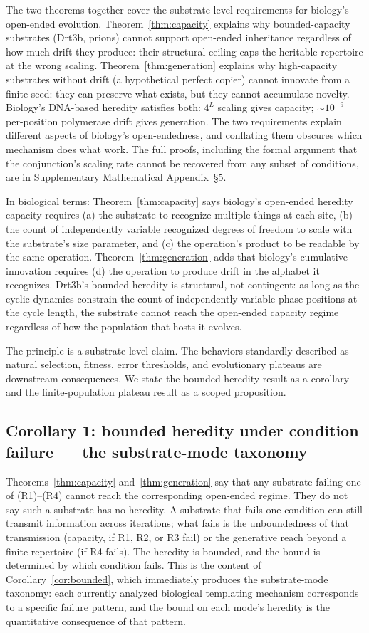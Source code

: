 \documentclass[aps,prx,reprint,amsmath,amssymb,floatfix,superscriptaddress,nofootinbib]{revtex4-2}
\theoremstyle{plain-thm}
\theoremstyle{definition-thm}
\begin{document}
The two theorems together cover the substrate-level requirements for biology's open-ended evolution. Theorem~\ref{thm:capacity} explains why bounded-capacity substrates (Drt3b, prions) cannot support open-ended inheritance regardless of how much drift they produce: their structural ceiling caps the heritable repertoire at the wrong scaling. Theorem~\ref{thm:generation} explains why high-capacity substrates without drift (a hypothetical perfect copier) cannot innovate from a finite seed: they can preserve what exists, but they cannot accumulate novelty. Biology's DNA-based heredity satisfies both: $4^L$ scaling gives capacity; $\sim 10^{-9}$ per-position polymerase drift gives generation. The two requirements explain different aspects of biology's open-endedness, and conflating them obscures which mechanism does what work. The full proofs, including the formal argument that the conjunction's scaling rate cannot be recovered from any subset of conditions, are in Supplementary Mathematical Appendix~\S5.

In biological terms: Theorem~\ref{thm:capacity} says biology's open-ended heredity capacity requires (a) the substrate to recognize multiple things at each site, (b) the count of independently variable recognized degrees of freedom to scale with the substrate's size parameter, and (c) the operation's product to be readable by the same operation. Theorem~\ref{thm:generation} adds that biology's cumulative innovation requires (d) the operation to produce drift in the alphabet it recognizes. Drt3b's bounded heredity is structural, not contingent: as long as the cyclic dynamics constrain the count of independently variable phase positions at the cycle length, the substrate cannot reach the open-ended capacity regime regardless of how the population that hosts it evolves.

The principle is a substrate-level claim. The behaviors standardly described as natural selection, fitness, error thresholds, and evolutionary plateaus are downstream consequences. We state the bounded-heredity result as a corollary and the finite-population plateau result as a scoped proposition.

\subsection{Corollary 1: bounded heredity under condition failure --- the substrate-mode taxonomy}

Theorems~\ref{thm:capacity} and~\ref{thm:generation} say that any substrate failing one of (R1)--(R4) cannot reach the corresponding open-ended regime. They do not say such a substrate has no heredity. A substrate that fails one condition can still transmit information across iterations; what fails is the unboundedness of that transmission (capacity, if R1, R2, or R3 fail) or the generative reach beyond a finite repertoire (if R4 fails). The heredity is bounded, and the bound is determined by which condition fails. This is the content of Corollary~\ref{cor:bounded}, which immediately produces the substrate-mode taxonomy: each currently analyzed biological templating mechanism corresponds to a specific failure pattern, and the bound on each mode's heredity is the quantitative consequence of that pattern.
\end{document}
